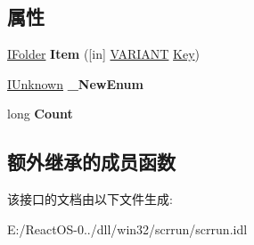 \subsection*{属性}
\begin{DoxyCompactItemize}
\item 
\mbox{\label{interface_scripting_1_1_i_folder_collection_a00113894b534362c8d086794be8a1c5f}} 
\hyperlink{interface_scripting_1_1_i_folder}{I\+Folder} {\bfseries Item} (\mbox{[}in\mbox{]} \hyperlink{structtag_v_a_r_i_a_n_t}{V\+A\+R\+I\+A\+NT} \hyperlink{struct_key}{Key})
\item 
\mbox{\label{interface_scripting_1_1_i_folder_collection_a5e878a58382541b2808fdf30ef43b71c}} 
\hyperlink{interface_i_unknown}{I\+Unknown} {\bfseries \+\_\+\+New\+Enum}
\item 
\mbox{\label{interface_scripting_1_1_i_folder_collection_ac22e2187608981995f43860542107eee}} 
long {\bfseries Count}
\end{DoxyCompactItemize}
\subsection*{额外继承的成员函数}


该接口的文档由以下文件生成\+:\begin{DoxyCompactItemize}
\item 
E\+:/\+React\+O\+S-\/0../dll/win32/scrrun/scrrun.\+idl\end{DoxyCompactItemize}
